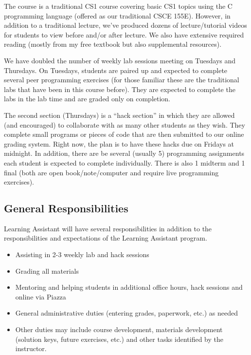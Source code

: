 \documentclass[12pt]{scrartcl}
\begin{document}
The course is a traditional CS1 course covering basic CS1 topics 
using the C programming language (offered as our traditional CSCE 155E).  
However, in addition to a traditional lecture, we've produced dozens of 
lecture/tutorial videos for students to view before and/or after lecture.  
We also have extensive required reading (mostly from my free textbook but 
also supplemental resources).  

We have doubled the number of weekly lab sessions meeting on Tuesdays and
Thursdays.  On Tuesdays, students are paired up and expected to complete 
several peer programming exercises (for those familiar these are the 
traditional labs that have been in this course before).  They are 
expected to complete the labs in the lab time and are graded only on 
completion.

The second section (Thursdays) is a ``hack section'' in which they are 
allowed (and encouraged) to collaborate with as many other students as 
they wish.  They complete small programs or pieces of code that are 
then submitted to our online grading system.  Right now, the plan is 
to have these hacks due on Fridays at midnight.  In addition, there are
be several (usually 5) programming assignments each student is expected
to complete individually.  There is also 1 midterm and 1 final (both 
are open book/note/computer and require live programming exercises). 

\subsection*{General Responsibilities}

Learning Assistant will have several responsibilities in addition to the
responsibilities and expectations of the Learning Assistant program.

\begin{itemize}
  \item Assisting in 2-3 weekly lab and hack sessions
  \item Grading all materials 
  \item Mentoring and helping students in additional office hours, hack sessions
  and online via Piazza
  \item General administrative duties (entering grades, paperwork, etc.) as needed
  \item Other duties may include course development, materials development 
  (solution keys, future exercises, etc.) and other tasks identified by the instructor.
\end{itemize}
\end{document}
